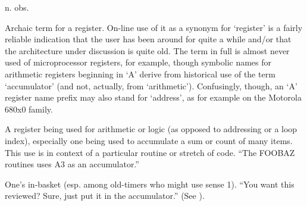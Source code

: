  n. obs.

\begin{inparaenum}
    \item Archaic term for a register. On-line use of it as a synonym for
        `register' is a fairly reliable indication that the user has been around
        for quite a while and/or that the architecture under discussion is quite
        old. The term in full is almost never used of microprocessor registers,
        for example, though symbolic names for arithmetic registers beginning in
        `A' derive from historical use of the term `accumulator' (and not,
        actually, from `arithmetic'). Confusingly, though, an `A' register name
        prefix may also stand for `address', as for example on the Motorola
        680x0 family.
    \item A register being used for arithmetic or logic (as opposed to
        addressing or a loop index), especially one being used to accumulate a
        sum or count of many items. This use is in context of a particular
        routine or stretch of code. ``The FOOBAZ routines uses A3 as an
        accumulator.''
    \item One's in-basket (esp. among old-timers who might use sense 1). ``You
        want this reviewed? Sure, just put it in the accumulator.'' (See
        ).
\end{inparaenum}

